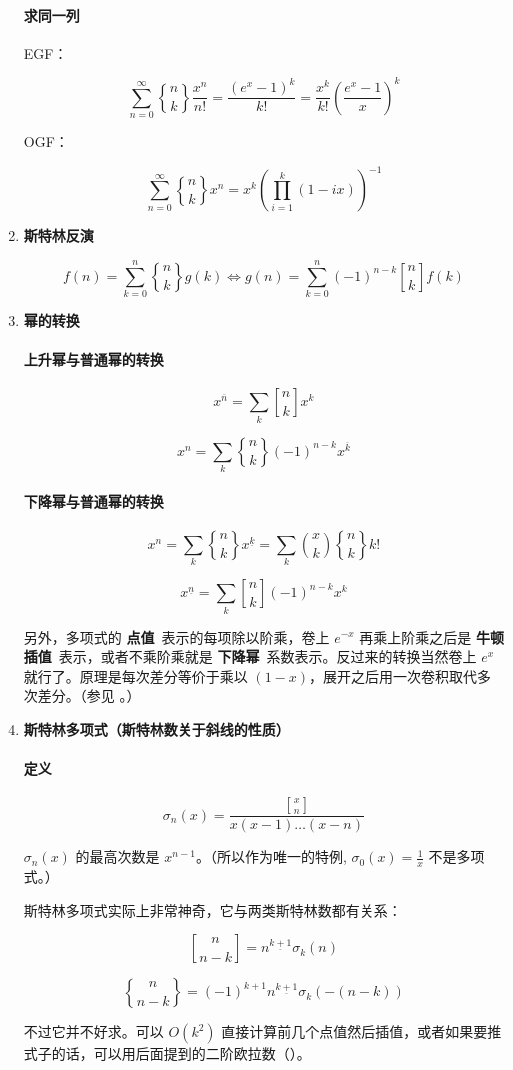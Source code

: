 \begin{enumerate}
\paragraph{求同一列} EGF：

$$ \sum_{n = 0} ^ \infty {n \brace k} \frac {x ^ n} {n!} = \frac {\left(e ^ x - 1\right) ^ k} {k!} = \frac {x ^ k} {k!} \left( \frac {e ^ x - 1} x \right) ^ k $$

OGF：

$$ \sum_{n = 0} ^ \infty {n \brace k} x ^ n = x ^ k \left(\prod_{i = 1} ^ k (1 - i x)\right) ^ {-1} $$

\item \textbf{斯特林反演}

$$ f(n) = \sum_{k = 0} ^ n {n \brace k} g(k) \iff g(n) = \sum_{k = 0} ^ n (-1) ^ {n - k} {n \brack k} f(k) $$

\item \textbf{幂的转换}

\paragraph{上升幂与普通幂的转换}

$$ x^{\overline{n}}=\sum_{k} {n \brack k} x^k $$

$$ x^n=\sum_{k} {n \brace k} (-1)^{n-k} x^{\overline{k}} $$

\paragraph{下降幂与普通幂的转换}

$$ x^n=\sum_{k} {n \brace k} x^{\underline{k}} = \sum_{k} {x \choose k} {n \brace k} k! $$

$$ x^{\underline{n}}=\sum_{k} {n \brack k} (-1)^{n-k} x^k $$

另外，多项式的 \textbf{点值}\ 表示的每项除以阶乘，卷上 $e^{-x}$ 再乘上阶乘之后是 \textbf{牛顿插值}\ 表示，或者不乘阶乘就是 \textbf{下降幂}\ 系数表示。反过来的转换当然卷上 $e^x$ 就行了。原理是每次差分等价于乘以 $(1 - x)$，展开之后用一次卷积取代多次差分。（参见 。）

\item \textbf{斯特林多项式（斯特林数关于斜线的性质）}

\paragraph{定义}

$$ \sigma_n(x) = \frac {{x\brack n}} {x(x-1)\dots(x-n)} $$

$\sigma_n(x)$ 的最高次数是 $x^{n - 1}$。（所以作为唯一的特例, $\sigma_0(x) = \frac 1 x$ 不是多项式。）

斯特林多项式实际上非常神奇，它与两类斯特林数都有关系：

$$ {n \brack n-k} = n^{\underline{k+1}} \sigma_k(n) $$

$$ {n \brace n-k} = (-1)^{k+1} n^{\underline{k+1}} \sigma_k(-(n-k)) $$

不过它并不好求。可以 $O(k^2)$ 直接计算前几个点值然后插值，或者如果要推式子的话，可以用后面提到的二阶欧拉数（）。

\end{enumerate}
